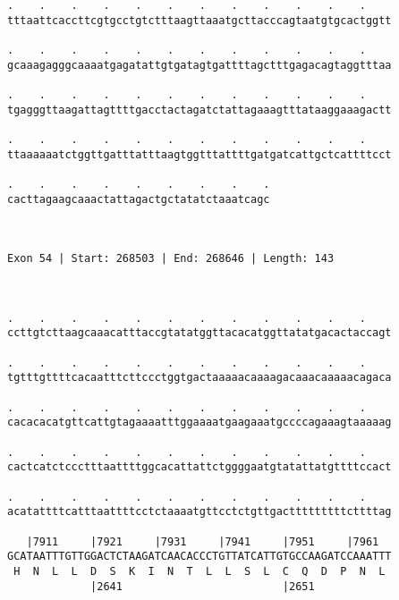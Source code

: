 \documentclass{article}
\begin{document}
\begin{Verbatim}
.    .    .    .    .    .    .    .    .    .    .    .    
tttaattcaccttcgtgcctgtctttaagttaaatgcttacccagtaatgtgcactggtt
                                                            
.    .    .    .    .    .    .    .    .    .    .    .    
gcaaagagggcaaaatgagatattgtgatagtgattttagctttgagacagtaggtttaa
                                                            
.    .    .    .    .    .    .    .    .    .    .    .    
tgagggttaagattagttttgacctactagatctattagaaagtttataaggaaagactt
                                                            
.    .    .    .    .    .    .    .    .    .    .    .    
ttaaaaaatctggttgatttatttaagtggtttattttgatgatcattgctcattttcct
                                                            
.    .    .    .    .    .    .    .    .
cacttagaagcaaactattagactgctatatctaaatcagc
                                         
                                         
 
Exon 54 | Start: 268503 | End: 268646 | Length: 143



.    .    .    .    .    .    .    .    .    .    .    .    
ccttgtcttaagcaaacatttaccgtatatggttacacatggttatatgacactaccagt
                                                            
.    .    .    .    .    .    .    .    .    .    .    .    
tgtttgttttcacaatttcttccctggtgactaaaaacaaaagacaaacaaaaacagaca
                                                            
.    .    .    .    .    .    .    .    .    .    .    .    
cacacacatgttcattgtagaaaatttggaaaatgaagaaatgccccagaaagtaaaaag
                                                            
.    .    .    .    .    .    .    .    .    .    .    .    
cactcatctccctttaattttggcacattattctggggaatgtatattatgttttccact
                                                            
.    .    .    .    .    .    .    .    .    .    .    .    
acatattttcatttaattttcctctaaaatgttcctctgttgactttttttttcttttag
                                                            
   |7911     |7921     |7931     |7941     |7951     |7961  
GCATAATTTGTTGGACTCTAAGATCAACACCCTGTTATCATTGTGCCAAGATCCAAATTT
 H  N  L  L  D  S  K  I  N  T  L  L  S  L  C  Q  D  P  N  L 
             |2641                         |2651            
  

\end{Verbatim}
\end{document}
